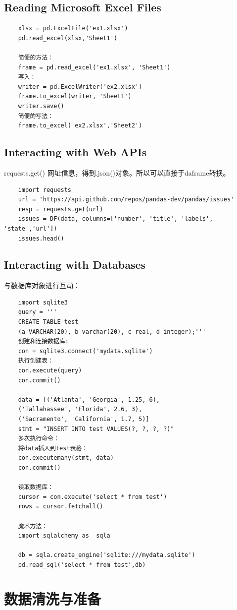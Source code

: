 \documentclass{article}
\begin{document}
\subsection{Reading Microsoft Excel Files}
\begin{lstlisting}
	xlsx = pd.ExcelFile('ex1.xlsx')
	pd.read_excel(xlsx,'Sheet1')
	
	简便的方法：
	frame = pd.read_excel('ex1.xlsx', 'Sheet1')
	写入：
	writer = pd.ExcelWriter('ex2.xlsx')
	frame.to_excel(writer, 'Sheet1')
	writer.save()
	简便的写法：
	frame.to_excel('ex2.xlsx','Sheet2')
\end{lstlisting}


\subsection{Interacting with Web APIs}
requests.get() 网址信息，得到.json()对象。所以可以直接于daframe转换。
\begin{lstlisting}
	import requests
	url = 'https://api.github.com/repos/pandas-dev/pandas/issues'
	resp = requests.get(url)
	issues = DF(data, columns=['number', 'title', 'labels', 'state','url'])
	issues.head()
\end{lstlisting}


\subsection{Interacting with Databases}
与数据库对象进行互动：
\begin{lstlisting}
	import sqlite3
	query = '''
	CREATE TABLE test
	(a VARCHAR(20), b varchar(20), c real, d integer);'''
	创建和连接数据库:
	con = sqlite3.connect('mydata.sqlite')
	执行创建表：
	con.execute(query)
	con.commit()
	
	data = [('Atlanta', 'Georgia', 1.25, 6),
	('Tallahassee', 'Florida', 2.6, 3),
	('Sacramento', 'California', 1.7, 5)]
	stmt = "INSERT INTO test VALUES(?, ?, ?, ?)"
	多次执行命令：
	将data插入到test表格：
	con.executemany(stmt, data)
	con.commit()
	
	读取数据库：
	cursor = con.execute('select * from test')
	rows = cursor.fetchall()
	
	魔术方法：
	import sqlalchemy as  sqla
	
	db = sqla.create_engine('sqlite:///mydata.sqlite')
	pd.read_sql('select * from test',db)
\end{lstlisting}

\section{数据清洗与准备}
\end{document}
